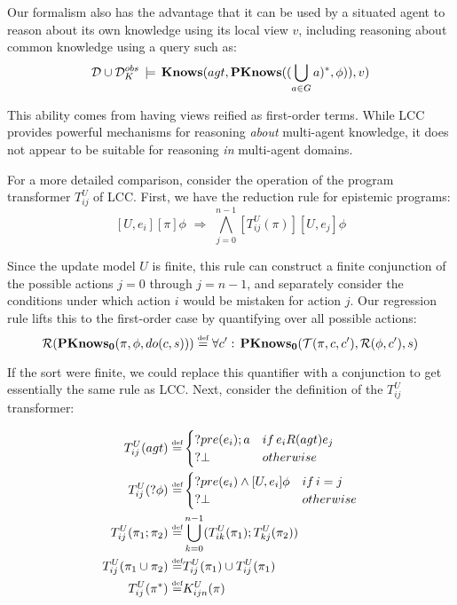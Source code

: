Our formalism also has the advantage that it can be used by a situated
agent to reason about its own knowledge using its local view $v$,
including reasoning about common knowledge using a query such as:\[
\mathcal{D}\cup\mathcal{D}_{K}^{obs}\,\models\,\mathbf{Knows}(agt,\mathbf{PKnows}((\bigcup_{a\in G}a)^{*},\phi)),v)\]


This ability comes from having views reified as first-order terms.
While LCC provides powerful mechanisms for reasoning \emph{about}
multi-agent knowledge, it does not appear to be suitable for reasoning
\emph{in} multi-agent domains.

For a more detailed comparison, consider the operation of the program
transformer $T_{ij}^{U}$ of LCC. First, we have the reduction rule
for epistemic programs:\[
[U,e_{i}][\pi]\phi\,\,\Rightarrow\,\,\bigwedge_{j=0}^{n-1}[T_{ij}^{U}(\pi)][U,e_{j}]\phi\]


Since the update model $U$ is finite, this rule can construct a finite
conjunction of the possible actions $j=0$ through $j=n-1$, and separately
consider the conditions under which action $i$ would be mistaken
for action $j$. Our regression rule lifts this to the first-order
case by quantifying over all possible actions:\[
\mathcal{R}(\mathbf{PKnows_{0}}(\pi,\phi,do(c,s)))\stackrel{\mbox{\tiny def}}{=}\forall c':\,\mathbf{PKnows_{0}}(\mathcal{T}(\pi,c,c'),\mathcal{R}(\phi,c'),s)\]


If the sort were finite, we could replace this quantifier
with a conjunction to get essentially the same rule as LCC. Next,
consider the definition of the $T_{ij}^{U}$ transformer:

\begin{align*}
T_{ij}^{U}(agt)\stackrel{\mbox{\tiny def}}{=} & \begin{cases}
?pre(e_{i});a & if\, e_{i}R(agt)e_{j}\\
?\bot & otherwise\end{cases}\\
T_{ij}^{U}(?\phi)\stackrel{\mbox{\tiny def}}{=} & \begin{cases}
?pre(e_{i})\wedge[U,e_{i}]\phi & if\, i=j\\
?\bot & otherwise\end{cases}\\
T_{ij}^{U}(\pi_{1};\pi_{2})\stackrel{\mbox{\tiny def}}{=} & \bigcup_{k=0}^{n-1}(T_{ik}^{U}(\pi_{1});T_{kj}^{U}(\pi_{2}))\\
T_{ij}^{U}(\pi_{1}\cup\pi_{2})\stackrel{\mbox{\tiny def}}{=} & T_{ij}^{U}(\pi_{1})\cup T_{ij}^{U}(\pi_{1})\\
T_{ij}^{U}(\pi^{*})\stackrel{\mbox{\tiny def}}{=} & K_{ijn}^{U}(\pi)\end{align*}


